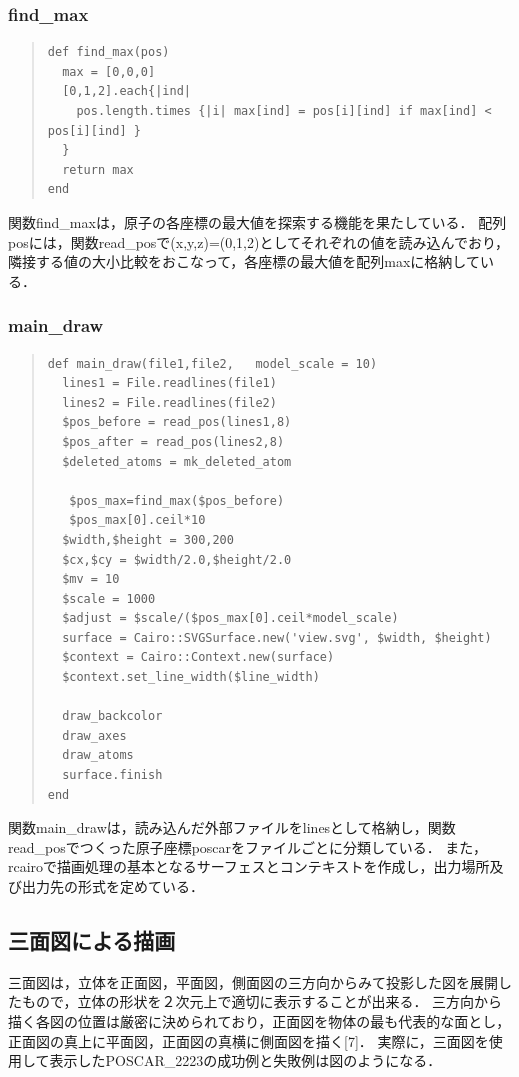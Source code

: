 \subsubsection{find\_max}\begin{quote}\begin{verbatim}
def find_max(pos)
  max = [0,0,0]
  [0,1,2].each{|ind|
    pos.length.times {|i| max[ind] = pos[i][ind] if max[ind] < pos[i][ind] }
  }
  return max
end
\end{verbatim}\end{quote}
関数find\_maxは，原子の各座標の最大値を探索する機能を果たしている．
配列posには，関数read\_posで(x,y,z)=(0,1,2)としてそれぞれの値を読み込んでおり，隣接する値の大小比較をおこなって，各座標の最大値を配列maxに格納している．

\subsubsection{main\_draw}\begin{quote}\begin{verbatim}
def main_draw(file1,file2,   model_scale = 10)
  lines1 = File.readlines(file1)
  lines2 = File.readlines(file2)
  $pos_before = read_pos(lines1,8)
  $pos_after = read_pos(lines2,8)
  $deleted_atoms = mk_deleted_atom

   $pos_max=find_max($pos_before)
   $pos_max[0].ceil*10
  $width,$height = 300,200
  $cx,$cy = $width/2.0,$height/2.0
  $mv = 10
  $scale = 1000
  $adjust = $scale/($pos_max[0].ceil*model_scale)
  surface = Cairo::SVGSurface.new('view.svg', $width, $height)
  $context = Cairo::Context.new(surface)
  $context.set_line_width($line_width)

  draw_backcolor
  draw_axes
  draw_atoms
  surface.finish
end
\end{verbatim}\end{quote}
関数main\_drawは，読み込んだ外部ファイルをlinesとして格納し，関数read\_posでつくった原子座標poscarをファイルごとに分類している．
また，rcairoで描画処理の基本となるサーフェスとコンテキストを作成し，出力場所及び出力先の形式を定めている．

\subsection{三面図による描画}
三面図は，立体を正面図，平面図，側面図の三方向からみて投影した図を展開したもので，立体の形状を２次元上で適切に表示することが出来る．
三方向から描く各図の位置は厳密に決められており，正面図を物体の最も代表的な面とし，正面図の真上に平面図，正面図の真横に側面図を描く[7]．
実際に，三面図を使用して表示したPOSCAR\_2223の成功例と失敗例は図のようになる．

